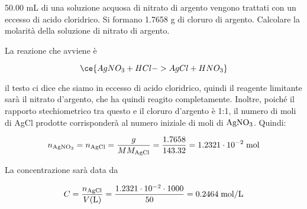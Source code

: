 \begin{esercizio}
    50.00 mL di una soluzione acquosa di nitrato di argento vengono trattati con un eccesso di acido cloridrico. Si formano 1.7658 g di cloruro di argento. Calcolare la molarità della soluzione di nitrato
di argento.
\end{esercizio}
\begin{soluzione}
    La reazione che avviene è

$$\ce{AgNO_3 + HCl -> AgCl + HNO_3}$$

il testo ci dice che siamo in eccesso di acido cloridrico, quindi il reagente limitante sarà il nitrato d'argento, che ha quindi reagito completamente. Inoltre, poiché il rapporto stechiometrico tra questo e il cloruro d'argento è 1:1, il numero di moli di AgCl prodotte corrisponderà al numero iniziale di moli di $\rm AgNO_3$. Quindi:

$$n_{\rm AgNO_3}=n_{\rm AgCl}=\frac{g}{MM_{\rm AgCl}}
=\frac{1.7658}{143.32}=1.2321 \cdot 10^{-2} \; \rm mol$$

La concentrazione sarà data da

$$C=\frac{n_{\rm AgCl}}{V(\text{L})}
=\frac{1.2321 \cdot 10^{-2} \cdot 1000}{50}
=0.2464 \; \rm mol/L$$
\end{soluzione}

\newpage

